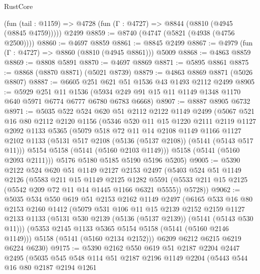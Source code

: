 \begin{lexlean}{RustCore}
\begin{coremodule}
    (fun (tail : @1159) => @4728 (fun (Γ : @4727) => @8844 (@8810 (@4945 (@8845 @4759)))))
    @2499
@8859 := @8740 (@4747 (@5821 (@4938 (@4756 @2500))))
@8860 := @4697 @8859
@8861 := @8845 @2499
@8867 := @4979 (fun (Γ : @4727) => @8860 (@8810 (@4945 @8861))) @5009
@8868 := @4863 @8859
@8869 := @8808 @5891
@8870 := @4697 @8869
@8871 := @5895 @8861
@8875 := @8868 (@8870 @8871) (@5021 @8739)
@8879 := @4863 @8869 @8871 (@5026 @8807)
@8887 := @6605 @251 @621 @51 @1536 @43 @1493 @2112 @2499
@8905 := @5929
    @251
    @11
    @1536
    (@5934 @249 @91 @15 @11 @1149 @1348 @1170 @640 @5971 @6774 @6777 @6780 @6783 @6668)
@8907 := @8887 @8905 @6732
@8971 := @5035
    @522
    @524
    @620
    @51
    @2112
    @2122
    @1149
    @2499
    (@5067
      @521
      @16
      @80
      @2112
      @2120
      @1156
      (@5346
        @520
        @11
        @15
        @1220
        @2111
        @2119
        @1127
        @2092
        @1133
        @5365
        (@5079
          @518
          @72
          @11
          @14
          @2108
          @1149
          @1166
          @1127
          @2102
          @1133
          (@5131 @517 @2108 (@5136 (@5137 @2108)) (@5141 (@5143 @517 @11)))
          @5154
          @5158
          (@5141 (@5160 @2103 @1149)))
        @5158
        (@5141 (@5160 @2093 @2111)))
      @5176
      @5180
      @5185
      @5190
      @5196
      @5205)
@9005 := @5390
    @2122
    @524
    @620
    @51
    @1149
    @2127
    @2153
    @2497
    (@5403
      @524
      @51
      @1149
      @2126
      (@5583
        @211
        @15
        @1149
        @2125
        @1282
        @5591
        (@5533 @211 @15 @2125 (@5542 @209 @72 @11 @14 @1445 @1166 @6321 @5555))
        @5728))
@9062 := @5035
    @534
    @550
    @619
    @51
    @2153
    @2162
    @1149
    @2497
    (@6165
      @533
      @16
      @80
      @2153
      @2160
      @1412
      (@5079
        @531
        @106
        @11
        @15
        @2139
        @2152
        @2159
        @1127
        @2133
        @1133
        (@5131 @530 @2139 (@5136 (@5137 @2139)) (@5141 (@5143 @530 @11)))
        (@5353 @2145 @1133 @5365 @5154 @5158 (@5141 (@5160 @2146 @1149)))
        @5158
        (@5141 (@5160 @2134 @2152)))
      @6209
      @6212
      @6215
      @6219
      @6224
      @6230)
@9175 := @5390
    @2162
    @550
    @619
    @51
    @2187
    @2204
    @2447
    @2495
    (@5035
      @545
      @548
      @114
      @51
      @2187
      @2196
      @1149
      @2204
      (@5443
        @544
        @16
        @80
        @2187
        @2194
        @1261

\end{coremodule}
\end{lexlean}
